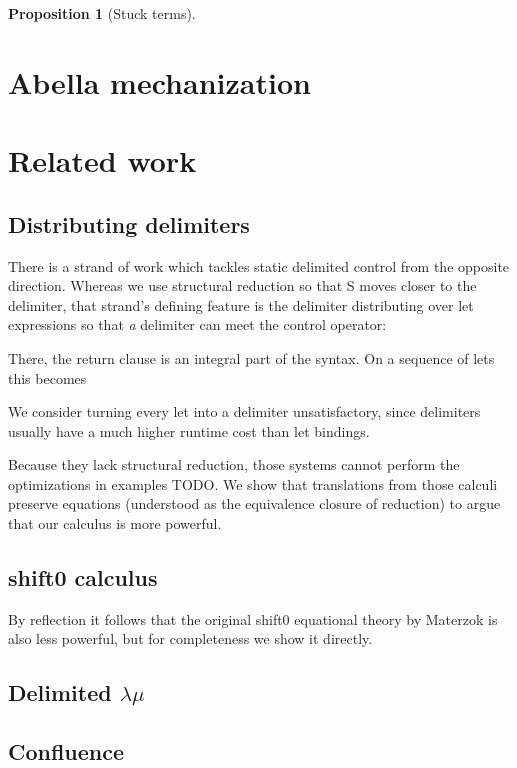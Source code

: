 \documentclass[a4paper, 11pt,titlepage, openright, twoside]{report}
\newcommand{\+}{\enspace}
\newtheorem{prop}{Proposition}
\begin{document}
\begin{prop}[Stuck terms]
\end{prop}

\chapter{Abella mechanization}

\chapter{Related work}


\section*{Distributing delimiters}
There is a strand of work which tackles static delimited control from the opposite direction.
Whereas we use structural reduction so that S moves closer to the delimiter, that strand's defining feature is
the delimiter distributing over let expressions so that \textit{a} delimiter can meet the control operator:

There, the return clause is an integral part of the syntax. On a sequence of lets this becomes

We consider turning every let into a delimiter unsatisfactory, since delimiters usually have a much higher runtime cost than let bindings.

Because they lack structural reduction, those systems cannot perform the optimizations in examples TODO.
We show that translations from those calculi preserve equations (understood as the equivalence closure of reduction)
to argue that our calculus is more powerful.

\section*{shift0 calculus}
By reflection\cite{ppdp21} it follows that the original shift0 equational theory by Materzok is also less powerful,
but for completeness we show it directly.

\section*{Delimited $λμ$}

\section*{Confluence}
\end{document}
